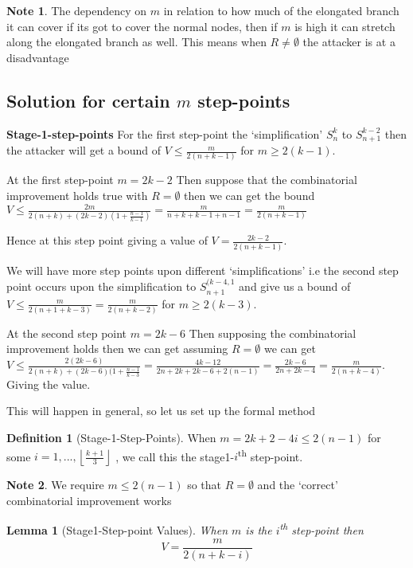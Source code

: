 \documentclass[a4paper,10pt]{article}
\newcommand{\floor}[1]{\left \lfloor #1 \right \rfloor}
\newtheorem{lemma}[theorem]{Lemma}
\theoremstyle{definition}
\newtheorem{definition}[theorem]{Definition}
\theoremstyle{definition}
\theoremstyle{remark}
\theoremstyle{definition}
\newtheorem*{note}{Note}
\begin{document}
\begin{note}
The dependency on $m$ in relation to how much of the elongated branch it can cover if its got to cover the normal nodes, then if $m$ is high it can stretch along the elongated branch as well. This means when $R \neq \emptyset$ the attacker is at a disadvantage
\end{note}

\subsection{Solution for certain $m$ step-points}

\textbf{Stage-1-step-points}
For the first step-point the `simplification' $S_{n}^{k}$ to $S_{n+1}^{k-2}$ then the attacker will get a bound of $V \leq \frac{m}{2(n+k-1)}$ for $m \geq 2(k-1)$.

At the first step-point $m=2k-2$
Then suppose that the combinatorial improvement holds true with $R = \emptyset$ then we can get the bound $V \leq \frac{2m}{2(n+k)+(2k-2)(1+\frac{n-1}{k-1})}=\frac{m}{n+k+k-1+n-1}=\frac{m}{2(n+k-1)}$

Hence at this step point giving a value of $V=\frac{2k-2}{2(n+k-1)}$.

We will have more step points upon different `simplifications' i.e the second step point occurs upon the simplification to $S_{n+1}^{(k-4,1}$ and give us a bound of $V \leq \frac{m}{2(n+1+k-3)}=\frac{m}{2(n+k-2)}$ for $m \geq 2(k-3)$.

At the second step point $m=2k-6$
Then supposing the combinatorial improvement holds then we can get assuming $R = \emptyset$ we can get $V \leq \frac{2(2k-6)}{2(n+k) + (2k-6)(1+\frac{n-1}{k-3}}=\frac{4k-12}{2n+2k+2k-6+2(n-1)}=\frac{2k-6}{2n+2k-4}=\frac{m}{2(n+k-4)}$. Giving the value.

This will happen in general, so let us set up the formal method

\begin{definition}[Stage-1-Step-Points]
When $m=2k+2-4i \leq 2(n-1)$ for some $i=1,...,\floor{\frac{k+1}{3}}$ , we call this the stage1-$i$\textsuperscript{th} step-point.
\end{definition}

\begin{note}
We require $m \leq 2(n-1)$ so that $R = \emptyset$ and the `correct' combinatorial improvement works
\end{note}

\begin{lemma}[Stage1-Step-point Values]
When $m$ is the $i$\textsuperscript{th} step-point then
$$V=\frac{m}{2(n+k-i)}$$
\end{lemma}
\end{document}
